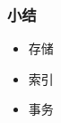 \documentclass[aspectratio=169, 14pt]{beamer}
\begin{document}
\begin{frame}
    \frametitle{小结}

\begin{itemize}
    \item 存储
    \item 索引
    \item 事务
\end{itemize}

\end{frame}
\end{document}
